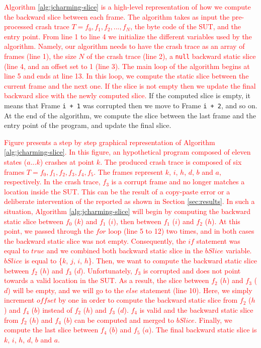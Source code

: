 \documentclass[times, doublespace]{smrauth}
\newcommand{\red}[1]{\textcolor{red}{#1}}
\begin{document}
{\red{Algorithm \ref{alg:jcharming-slice} is a high-level
representation of how we compute the backward slice between
each frame.
The algorithm takes as input the pre-processed
crash trace $T={f_0, f_1, f_2, ..., f_N}$, the byte code of the SUT, and the entry point. From
line 1 to line 4 we initialize the different variables used by the
algorithm.
Namely, our algorithm needs to have the crash trace as an array of frames (line 1), the size $N$ of the crash trace (line 2), a \texttt{null} backward static slice (line 4, and an offset set to 1 (line 3).
The main loop of the algorithm begins at line 5 and
ends at line 13.
In this loop, we compute the static slice
between the current frame and the next one. If the slice is not empty then we update the final backward
slice with the newly computed slice.}
If the computed slice is empty, it means that Frame {\tt i + 1}
was corrupted then we move to Frame {\tt i + 2}, and so on.
At the end of the algorithm, we compute the slice between the
last frame and the entry point of the program, and update the
final slice.

\red{Figure \label{fig:jcharming-algo} presents a step by step graphical representation of Algorithm \ref{alg:jcharming-slice}.
In this figure, an hypothetical program composed of eleven states ($a...k$) crashes at point $k$.
The produced crash trace is composed of six frames $T={f_0, f_1, f_2, f_3, f_4, f_5}$.
The frames represent $k$, $i$, $h$, $d$, $b$ and $a$, respectively.
In the crash trace, $f_3$ is a corrupt frame and no longer matches a location inside the SUT. This can be the result of a copy-paste error or a deliberate intervention of the reported as shown in Section \ref{sec:results}.
In such a situation, Algorithm \ref{alg:jcharming-slice} will begin by computing the backward static slice between $f_0$ ($k$) and $f_1$ ($i$), then between  $f_1$ ($i$) and $f_2$ ($h$).
At this point, we passed through the $for$ loop (line 5 to 12) two times, and in both cases the backward static slice was not empty.
Consequently, the $if$ statement was equal to $true$ and we combined both backward static slice in the $bSlice$ variable.
$bSlice$ is equal to \{$k$, $j$, $i$, $h$\}.
Then, we want to compute the backward static slice between $f_2$ ($h$) and $f_3$ ($d$).
Unfortunately, $f_3$ is corrupted and does not point towards a valid location in the SUT.
As a result, the slice between $f_2$ ($h$) and $f_3$ ($d$) will be empty, and we will go to the $else$ statement (line 10).
Here, we simply increment $offset$ by one in order to compute the backward static slice from $f_2$ ($h$) and $f_4$ ($b$) instead of $f_2$ ($h$) and $f_3$ ($d$).
$f_4$ is valid and the backward static slice from $f_2$ ($h$) and $f_4$ ($b$) can be computed and merged to $bSlice$.
Finally, we compute the last slice between $f_4$ ($b$) and $f_5$ ($a$).
The final backward static slice is $k$, $i$, $h$, $d$, $b$ and $a$.}

}
\end{document}
